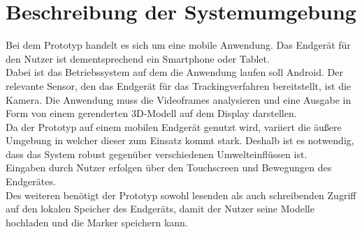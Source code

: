 \section{Beschreibung der Systemumgebung}
Bei dem Prototyp handelt es sich um eine mobile Anwendung. Das Endgerät für den Nutzer ist dementsprechend ein Smartphone oder Tablet. \\
Dabei ist das Betriebssystem auf dem die Anwendung laufen soll Android.
Der relevante Sensor, den das Endgerät für das Trackingverfahren bereitstellt, ist die Kamera. Die Anwendung muss die Videoframes analysieren und eine Ausgabe in Form von einem gerenderten 3D-Modell auf dem Display darstellen. \\
Da der Prototyp auf einem mobilen Endgerät genutzt wird, variiert die äußere Umgebung in welcher dieser zum Einsatz kommt stark. Deshalb ist es notwendig, dass das System robust gegenüber verschiedenen Umwelteinflüssen ist.\\
Eingaben durch Nutzer erfolgen über den Touchscreen und Bewegungen des Endgerätes. \\
Des weiteren benötigt der Prototyp sowohl lesenden als auch schreibenden Zugriff auf den lokalen Speicher des Endgeräts, damit der Nutzer seine Modelle hochladen und die Marker speichern kann. 


